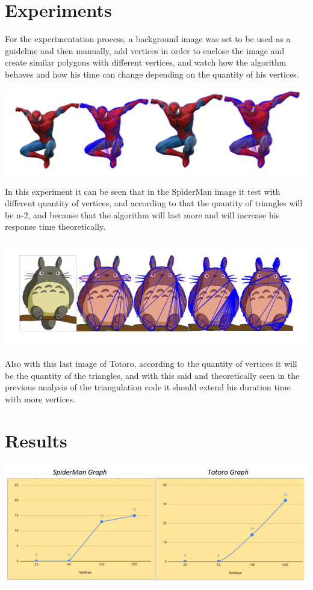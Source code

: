 \documentclass[conference]{IEEEtran}
\begin{document}
\section{Experiments}
For the experimentation process, a background image was set to be used as a guideline and then manually, add vertices in order to enclose the image and create similar polygons with different vertices, and watch how the algorithm behaves and how his time can change depending on the quantity of his vertices.

\includegraphics[scale=0.6]{spideyresults.png}

In this experiment it can be seen that in the SpiderMan image it test with different quantity of vertices, and according to that the quantity of triangles will be n-2, and because that the algorithm will last more and will increase his response time theoretically.

\includegraphics[scale=0.53]{totoroResults.png}

Also with this last image of Totoro, according to the quantity of vertices it will be the quantity of the triangles, and with this said and theoretically seen in the previous analysis of the triangulation code it should extend his duration time with more vertices.

\section{Results}

\includegraphics[scale=0.58]{Graphs.png}
\end{document}
